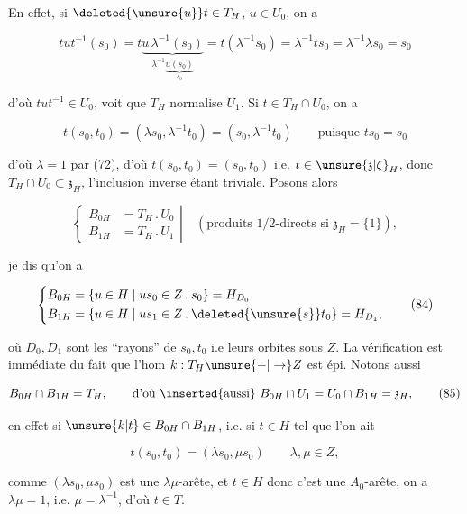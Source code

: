 En effet, si $\deleted{\unsure{u}}t\in T_H$, $u\in U_0$, on a

\[
tut^{-1}(s_0)=t\underbrace{u\,\lambda^{-1}(s_0)}_{\lambda^{-1}\underbrace{u(s_0)}_{s_0}}=t(\lambda^{-1}s_0)=\lambda^{-1}ts_0=\lambda^{-1}\lambda s_0=s_0
\]

d'où $tut^{-1}\in U_0$,   voit  que $T_H$ normalise $U_1$. Si $t\in T_H\cap U_0$, on a

\[
t(s_0,t_0)=(\lambda s_0,\lambda^{-1}t_0)=(s_0,\lambda^{-1}t_0)\qquad\text{puisque }ts_0=s_0
\]


d'où $\lambda=1$ par (72), d'où $t(s_0,t_0)=(s_0,t_0)$ i.e. $t\in\unsure{\mathfrak z|\zeta}_H$, donc $T_H\cap U_0\subset\mathfrak z_H$, l'inclusion inverse étant triviale.  Posons alors

\[
\left\{\begin{aligned}
B_{0H}&=T_H\mathbin{.}U_0\\
B_{1H}&=T_H\mathbin{.}U_1
\end{aligned}\right|\quad(\text{produits }1/2\text{-directs si }\mathfrak z_H=\{1\}),
\tag*{(83)}
\]

je dis qu'on a

\[
\left\{\begin{aligned}
B_{0H}&=\{u\in H\mid us_0\in Z\mathbin{.}s_0\}=H_{D_0}\\
B_{1H}&=\{u\in H\mid us_1\in Z\mathbin{.}\deleted{\unsure{s}}t_0\}=H_{D_1},
\end{aligned}\right.
\tag*{(84)}
\]

où $D_0,D_1$ sont les \textquotedblleft{}\uline{rayons}\textquotedblright{} de $s_0,t_0$ i.e leurs orbites sous $Z$. La vérification est immédiate du fait que l'hom $k:T_H\unsure{-|\to}Z$ est épi. Notons aussi

\[
B_{0H}\cap B_{1H}=T_H,\qquad\text{d'où \inserted{aussi} }B_{0H}\cap U_1=U_0\cap B_{1H}=\mathfrak z_H,
\tag*{(85)}
\]

en effet si $\unsure{k|t}\in B_{0H}\cap B_{1H}$, i.e. si $t\in H$ tel que l'on ait

\[
t(s_0,t_0)=(\lambda s_0,\mu s_0)\qquad\lambda,\mu\in Z,
\]

comme $(\lambda s_0,\mu s_0)$ est une $\lambda\mu$-arête, et $t\in H$\unsure{,} donc c'est une $A_0$-arête, on a $\lambda\mu=1$, i.e. $\mu=\lambda^{-1}$, d'où $t\in T$. 

